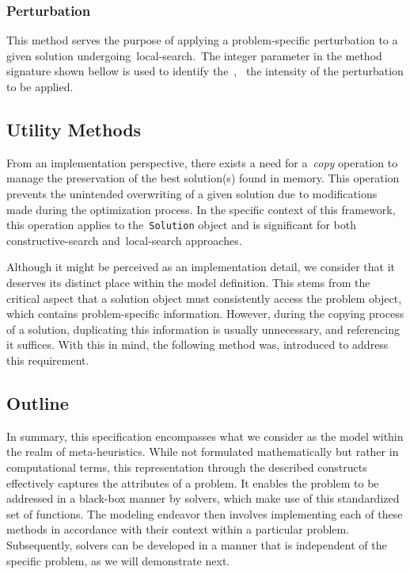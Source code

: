 \subsubsection*{Perturbation}

This method serves the purpose of applying a problem-specific perturbation to
a given solution undergoing~\acrshort{local-search}.~The integer parameter in the
method signature shown bellow is used to identify the~,~\ie{}
the intensity of the perturbation to be applied.

\begin{center}
\end{center}

\subsection{Utility Methods}

From an implementation perspective, there exists a need for a~\emph{copy} operation to
manage the preservation of the best solution(s) found in memory. This operation
prevents the unintended overwriting of a given solution due to modifications
made during the optimization process. In the specific context of this framework,
this operation applies to the~\texttt{Solution} object and is significant for both
\acrshort{constructive-search} and~\acrshort{local-search} approaches.

Although it might be perceived as an implementation detail, we consider that it
deserves its distinct place within the model definition. This stems from the
critical aspect that a solution object must consistently access the problem
object, which contains problem-specific information. However, during the copying
process of a solution, duplicating this information is usually unnecessary, and
referencing it suffices. With this in mind, the following method was, introduced
to address this requirement.

\begin{center}
\end{center}

\subsection{Outline}

In summary, this specification encompasses what we consider as the model within
the realm of meta-heuristics. While not formulated mathematically but rather in
computational terms, this representation through the described constructs
effectively captures the attributes of a problem. It enables the problem to be
addressed in a black-box manner by solvers, which make use of this standardized
set of functions. The modeling endeavor then involves implementing each of these
methods in accordance with their context within a particular problem.
Subsequently, solvers can be developed in a manner that is independent of the
specific problem, as we will demonstrate next.